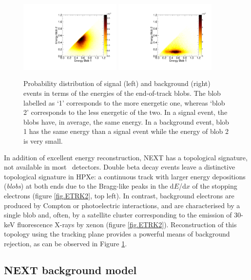 \begin{figure}
\centering
\includegraphics[width=0.45\textwidth]{img/EnergyBlobsSignal.pdf}
\includegraphics[width=0.45\textwidth]{img/EnergyBlobsTl208.pdf}
\caption{Probability distribution of signal (left) and background (right) events in terms of the energies of the end-of-track blobs. The blob labelled as `1' corresponds to the more energetic one, whereas `blob 2' corresponds to the less energetic of the two. In a signal event, the blobs have, in average, the same energy. In a background event, blob 1 has the same energy than a signal event while the energy of blob 2 is very small.} \label{fig.BLOBS}
\end{figure}

In addition of excellent energy reconstruction, NEXT has a topological signature, not available in most \bbonu\ detectors. 
Double beta decay events leave a distinctive topological signature in HPXe: a continuous track with larger energy depositions (\emph{blobs}) at both ends due to the Bragg-like peaks in the d$E$/d$x$ of the stopping electrons (figure \ref{fig.ETRK2}, top left). In contrast, background electrons are produced by Compton or photoelectric interactions, and are characterised by a single blob and, often, by a satellite cluster corresponding to the emission of 30-keV fluorescence X-rays by xenon (figure \ref{fig.ETRK2}).
Reconstruction of this topology using the tracking plane provides a powerful means of background rejection, as can be observed in Figure \ref{fig.BLOBS}. 

\subsection{NEXT background model}

